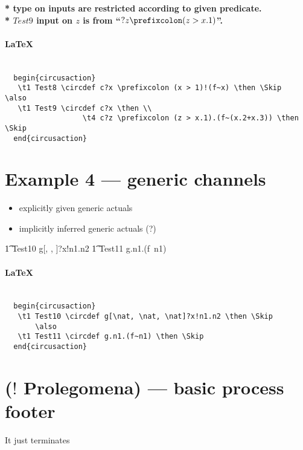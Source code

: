 \documentclass{article}
\begin{document}
\textbf{* type on inputs are restricted according to given predicate.}
\\
\indent \textbf{* $Test9$ input on $z$ is from ``$?z \prefixcolon (z > x.1)$''.}

\paragraph{\LaTeX\\ \\}

\begin{verbatim}
  begin{circusaction}
   \t1 Test8 \circdef c?x \prefixcolon (x > 1)!(f~x) \then \Skip
\also
   \t1 Test9 \circdef c?x \then \\
                  \t4 c?z \prefixcolon (z > x.1).(f~(x.2+x.3)) \then \Skip
  end{circusaction}
\end{verbatim}

\newpage
\section{Example 4 --- generic channels}

\begin{itemize}
   \item explicitly given generic actuals
   \item implicitly inferred generic actuals (?)
\end{itemize}

\begin{circusaction}
   \t1 Test10 \circdef g[\nat, \nat, \nat]?x!n1.n2 \then \Skip
        \also
   \t1 Test11 \circdef g.n1.(f~n1) \then \Skip
\end{circusaction}

\paragraph{\LaTeX\\ \\}

\begin{verbatim}
  begin{circusaction}
   \t1 Test10 \circdef g[\nat, \nat, \nat]?x!n1.n2 \then \Skip
       \also
   \t1 Test11 \circdef g.n1.(f~n1) \then \Skip
  end{circusaction}
\end{verbatim}


\newpage
\section{($!$ Prolegomena) --- basic process footer}

It just terminates

\begin{circusaction}
   \circspot \Skip
\end{circusaction}

\begin{circus}
   \circend
\end{circus}
\end{document}
